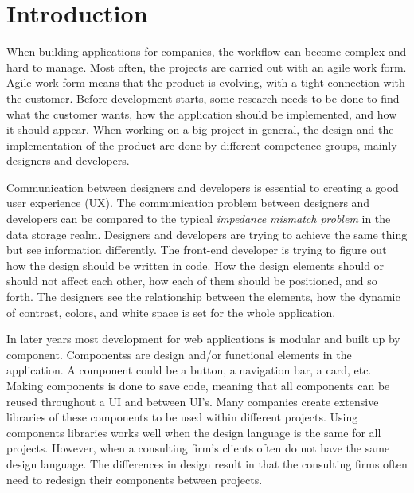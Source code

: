 \section{Introduction}



When building applications for companies, the workflow can become complex and hard to manage. Most often, the projects are carried out with an agile work form\cite{cohen2004introduction}. Agile work form means that the product is evolving, with a tight connection with the customer. Before development starts, some research needs to be done to find what the customer wants, how the application should be implemented, and how it should appear. When working on a big project in general, the design and the implementation of the product are done by different competence groups, mainly designers and developers. 

Communication between designers and developers is essential to creating a good user experience (UX). The communication problem between designers and developers can be compared to the typical \textit{impedance mismatch problem} in the data storage realm. Designers and developers are trying to achieve the same thing but see information differently. The front-end developer is trying to figure out how the design should be written in code. How the design elements should or should not affect each other, how each of them should be positioned, and so forth. The designers see the relationship between the elements, how the dynamic of contrast, colors, and white space is set for the whole application. 

In later years most development for web applications is modular and built up by \gls{component}. \Glspl{Components} are design and/or functional elements in the application. A \gls{component} could be a button, a navigation bar, a card\cite{babichSimpleDesignTips2020}, etc. Making components is done to save code, meaning that all components can be reused throughout a UI and between UI's. Many companies create extensive libraries of these components to be used within different projects. Using components libraries works well when the design language is the same for all projects. However, when a consulting firm's clients often do not have the same design language. The differences in design result in that the consulting firms often need to redesign their components between projects. 




